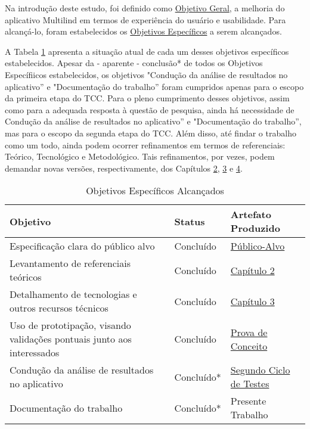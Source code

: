 Na introdução deste estudo, foi definido como \hyperref[sec:Objetivos]{Objetivo Geral}, a melhoria do aplicativo Multilind em termos de experiência do usuário e usabilidade. 
Para alcançá-lo, foram estabelecidos os \hyperref[sec:Objetivos]{Objetivos Específicos} a serem alcançados.

A Tabela \ref{tab09} apresenta a situação atual de cada um desses objetivos específicos estabelecidos. Apesar da - aparente - conclusão* de todos os Objetivos Específiicos 
estabelecidos, os objetivos "Condução da análise de resultados no aplicativo'' e "Documentação do trabalho'' foram cumpridos apenas para o escopo da primeira etapa do TCC. 
Para o pleno cumprimento desses objetivos, assim como para a adequada resposta à questão de pesquisa, ainda há necessidade de Condução da análise de resultados no aplicativo'' 
e "Documentação do trabalho'', mas para o escopo da segunda etapa do TCC. Além disso, até findar o trabalho como um todo, ainda podem ocorrer refinamentos em termos de referenciais: 
Teórico, Tecnológico e Metodológico. Tais refinamentos, por vezes, podem demandar novas versões, respectivamente, dos Capítulos \hyperref[chap:Referencial]{2}, 
\hyperref[chap:ReferencialTech]{3} e \hyperref[chap:Metodologia]{4}.

\begin{table}[h!]
	\centering
	\caption{Objetivos Específicos Alcançados}
	\label{tab09}
	\begin{tabularx}{\textwidth}{p{8cm}|p{2cm}|p{4cm}}
	\hline
    Objetivo                                                        & Status       & Artefato Produzido             \\ \hline
    Especificação clara do público alvo                                                     & Concluído    & \hyperref[Publico-Alvo]{Público-Alvo}              \\
    Levantamento de referenciais teóricos                                          & Concluído    & \hyperref[chap:Referencial]{Capítulo 2}                   \\
    Detalhamento de tecnologias e outros recursos técnicos                                       & Concluído    & \hyperref[chap:ReferencialTech]{Capítulo 3}                    \\
    Uso de prototipação, visando validações pontuais junto aos interessados                                      & Concluído    & \hyperref[sec:Prova de Conceito]{Prova de Conceito}                   \\
    Condução da análise de resultados no aplicativo                                          & Concluído*    & \hyperref[sec:Segundo Ciclo]{Segundo Ciclo de Testes}                    \\
    Documentação do trabalho                       & Concluído*    & Presente Trabalho         \\ \hline
	\end{tabularx}
\end{table}

